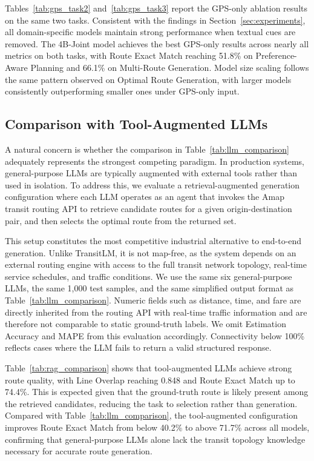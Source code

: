 \documentclass{article}
\begin{document}
Tables~\ref{tab:gps_task2} and~\ref{tab:gps_task3} report the GPS-only ablation results on the same two tasks. Consistent with the findings in Section~\ref{sec:experiments}, all domain-specific models maintain strong performance when textual cues are removed. The 4B-Joint model achieves the best GPS-only results across nearly all metrics on both tasks, with Route Exact Match reaching 51.8\% on Preference-Aware Planning and 66.1\% on Multi-Route Generation. Model size scaling follows the same pattern observed on Optimal Route Generation, with larger models consistently outperforming smaller ones under GPS-only input.

\subsection{Comparison with Tool-Augmented LLMs}
\label{app:rag_comparison}

A natural concern is whether the comparison in Table~\ref{tab:llm_comparison} adequately represents the strongest competing paradigm. In production systems, general-purpose LLMs are typically augmented with external tools rather than used in isolation. To address this, we evaluate a retrieval-augmented generation configuration where each LLM operates as an agent that invokes the Amap transit routing API to retrieve candidate routes for a given origin-destination pair, and then selects the optimal route from the returned set.

This setup constitutes the most competitive industrial alternative to end-to-end generation. Unlike TransitLM, it is not map-free, as the system depends on an external routing engine with access to the full transit network topology, real-time service schedules, and traffic conditions. We use the same six general-purpose LLMs, the same 1{,}000 test samples, and the same simplified output format as Table~\ref{tab:llm_comparison}. Numeric fields such as distance, time, and fare are directly inherited from the routing API with real-time traffic information and are therefore not comparable to static ground-truth labels. We omit Estimation Accuracy and MAPE from this evaluation accordingly. Connectivity below 100\% reflects cases where the LLM fails to return a valid structured response.

Table~\ref{tab:rag_comparison} shows that tool-augmented LLMs achieve strong route quality, with Line Overlap reaching 0.848 and Route Exact Match up to 74.4\%. This is expected given that the ground-truth route is likely present among the retrieved candidates, reducing the task to selection rather than generation. Compared with Table~\ref{tab:llm_comparison}, the tool-augmented configuration improves Route Exact Match from below 40.2\% to above 71.7\% across all models, confirming that general-purpose LLMs alone lack the transit topology knowledge necessary for accurate route generation.
\end{document}
